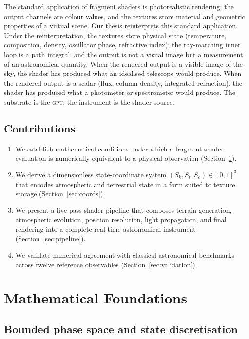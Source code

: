 \documentclass[11pt,twocolumn,a4paper]{article}
\theoremstyle{definition}
\theoremstyle{remark}
\newcommand{\gpu}{\textsc{gpu}}
\begin{document}
The standard application of fragment shaders is photorealistic rendering: the output channels are colour values, and the textures store material and geometric properties of a virtual scene. Our thesis reinterprets this standard application. Under the reinterpretation, the textures store physical state (temperature, composition, density, oscillator phase, refractive index); the ray-marching inner loop is a path integral; and the output is not a visual image but a measurement of an astronomical quantity. When the rendered output is a visible image of the sky, the shader has produced what an idealised telescope would produce. When the rendered output is a scalar (flux, column density, integrated refraction), the shader has produced what a photometer or spectrometer would produce. The substrate is the \gpu; the instrument is the shader source.

\subsection{Contributions}

\begin{enumerate}[nosep]
\item We establish mathematical conditions under which a fragment shader evaluation is numerically equivalent to a physical observation (Section~\ref{sec:foundations}).
\item We derive a dimensionless state-coordinate system $(S_k, S_t, S_e) \in [0,1]^3$ that encodes atmospheric and terrestrial state in a form suited to texture storage (Section~\ref{sec:coords}).
\item We present a five-pass shader pipeline that composes terrain generation, atmospheric evolution, position resolution, light propagation, and final rendering into a complete real-time astronomical instrument (Section~\ref{sec:pipeline}).
\item We validate numerical agreement with classical astronomical benchmarks across twelve reference observables (Section~\ref{sec:validation}).
\end{enumerate}

\section{Mathematical Foundations}
\label{sec:foundations}

\subsection{Bounded phase space and state discretisation}
\end{document}
